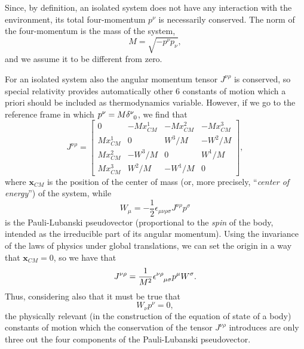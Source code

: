 \documentclass[twocolumn,usenatbib]{mnras2}
\begin{document}
Since, by definition, an isolated system does not have any interaction with the environment, its total four-momentum $p^\nu$ is necessarily conserved. The norm of the four-momentum is the mass of the system,
\begin{equation}\label{Massa}
M = \sqrt{-p^\nu p_\nu},
\end{equation}
and we assume it to be different from zero.

For an isolated system also the angular momentum tensor $J^{\nu \rho}$ is conserved, so special relativity provides automatically other 6 constants of motion which a priori should be included as thermodynamics variable. However, if we go to the reference frame in which $p^\nu = M \delta\indices{^\nu _0}$, we find that \citep{Weinberg_book_1972}
\begin{equation}\label{Mmmm}
J^{\nu \rho} =
\begin{bmatrix}
  0  & -M x_{CM}^1 &  -M x_{CM}^2 &  -M x_{CM}^3  \\
   M x_{CM}^1 & 0 & W^3/M & -W^2/M  \\
   M x_{CM}^2 & -W^3/M & 0 & W^1/M \\
   M x_{CM}^3 & W^2/M & -W^1/M & 0
\end{bmatrix},
\end{equation} 
where $\textbf{x}_{CM}$ is the position of the center of mass (or, more precisely, ``\textit{center of energy}'') of the system,
while
\begin{equation}
W_\mu = -\dfrac{1}{2} \epsilon_{\mu \nu \rho \sigma} J^{\nu \rho} p^\sigma
\end{equation}
is the Pauli-Lubanski pseudovector (proportional to the \textit{spin} of the body, intended as the irreducible part of its angular momentum).
Using the invariance of the laws of physics under global translations, we can set the origin in a way that $\textbf{x}_{CM}=0$, so we have that
\begin{equation}
J^{\nu \rho} =\dfrac{1}{M^2} \epsilon\indices{^\nu ^\rho _\mu _\sigma} p^\mu W^\sigma.
\end{equation}
Thus, considering also that it must be true that
\begin{equation}
W_\nu p^\nu =0,
\end{equation}
the physically relevant (in the construction of the equation of state of a body) constants of motion which the conservation of the tensor $J^{\nu \rho}$ introduces are only three out the four components of the Pauli-Lubanski pseudovector.
\end{document}
